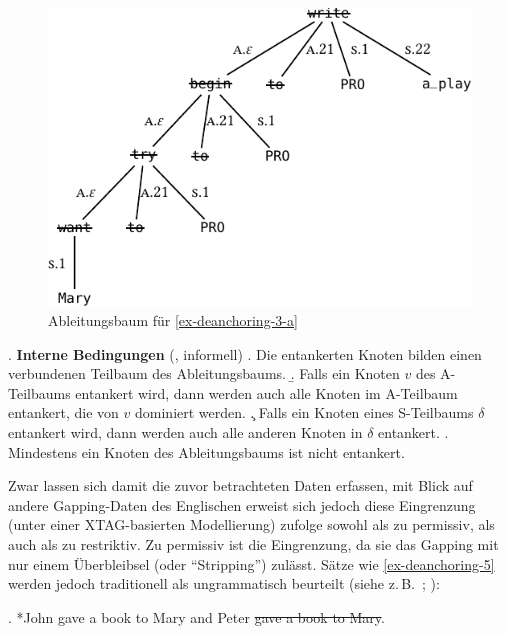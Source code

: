 \begin{figure}[p]
\centering
\includegraphics{graphics/abb818.pdf}
\caption{\label{fig-deanchoring-5}Ableitungsbaum für \ref{ex-deanchoring-3-a} \citep[Abbildung~6]{Lichte:Kallmeyer:10}}
\end{figure} 
\clearpage 

\ex. {\bf Interne Bedingungen} (\cite{Lichte:Kallmeyer:10}, informell) \label{ex-entankerung-interne-bedingungen}
\a. Die entankerten Knoten bilden einen verbundenen Teilbaum des Ableitungsbaums.
\b. Falls ein Knoten $v$ des A-Teilbaums entankert wird, dann werden auch alle Knoten im A-Teilbaum entankert, die von $v$ dominiert werden.\label{ex-entankerung-interne-bedingungen-b}
\c. Falls ein Knoten eines S-Teilbaums $\delta$ entankert wird, dann werden auch alle anderen Knoten in $\delta$ entankert.
\e. Mindestens ein Knoten des Ableitungsbaums ist nicht entankert.

Zwar lassen sich damit die zuvor betrachteten Daten erfassen, mit Blick auf andere Gapping-Daten des Englischen erweist sich jedoch diese Eingrenzung (unter einer XTAG-basierten Modellierung) \cite{Lichte:Kallmeyer:10} zufolge sowohl als zu permissiv, als auch als zu restriktiv. Zu permissiv ist die Eingrenzung, da sie das Gapping mit nur einem Überbleibsel (oder "`Stripping"') zulässt. Sätze wie \ref{ex-deanchoring-5} werden jedoch traditionell als ungrammatisch beurteilt (siehe z.\,B.\ \citealt[27a]{Jackendoff:71}; \citealt[3]{Johnson:04}):

\ex.  *John gave a book to Mary and Peter \sout{gave a book to Mary}.\\
\citep[(13)]{Lichte:Kallmeyer:10}\label{ex-deanchoring-5}

